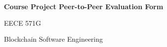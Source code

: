 \documentclass[12pt]{article}
\renewcommand{\_}{\kern-1.5pt\textunderscore\kern-1.5pt}
\begin{document}





\vspace{\baselineskip}



\newpage

\vspace{\baselineskip}
\vspace{\baselineskip}
\textbf{Course Project Peer-to-Peer Evaluation Form}\par


\vspace{\baselineskip}
\begin{Center}
EECE 571G 
\end{Center}\par

\begin{Center}
Blockchain Software Engineering
\end{Center}\par
\end{document}
